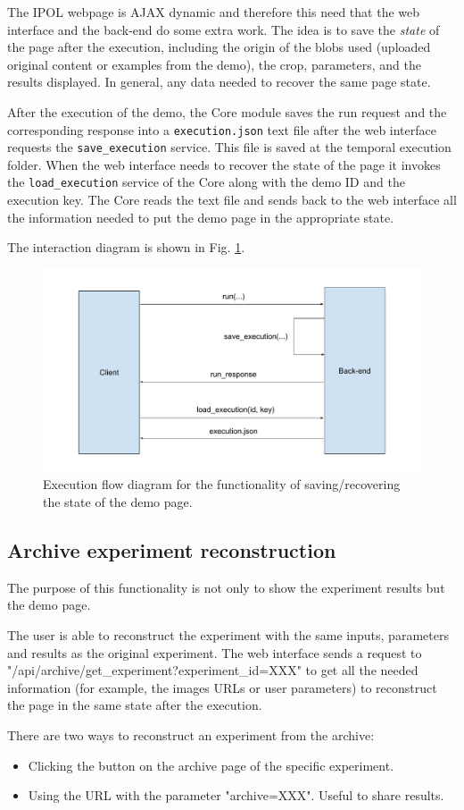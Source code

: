 The IPOL webpage is AJAX dynamic and therefore this need that the web interface and the back-end do some extra work. The idea is to save the \emph{state} of the page after the execution, including the origin of the blobs used (uploaded original content or examples from the demo), the crop, parameters, and the results displayed. In general, any data needed to recover the same page state.

After the execution of the demo, the Core module saves the run request and the corresponding response into a {\tt execution.json} text file after the web interface requests the {\tt save\_execution} service. This file is saved at the temporal execution folder.
%
When the web interface needs to recover the state of the page it invokes the {\tt load\_execution} service of the Core along with the demo ID and the execution key. The Core reads the text file and sends back to the web interface all the information needed to put the demo page in the appropriate state.

The interaction diagram is shown in Fig. \ref{fig:execution_flow}.

\begin{figure}[h]
	\centering
	\includegraphics[width=\textwidth]{images/execution_flow}
	\caption{Execution flow diagram for the functionality of saving/recovering the state of the demo page.} 
	\label{fig:execution_flow}
\end{figure}

\subsection{Archive experiment reconstruction}
The purpose of this functionality is not only to show the experiment results but the demo page.

The user is able to reconstruct the experiment with the same inputs, parameters and results as the original experiment. The web interface sends a request to "/api/archive/get\_experiment?experiment\_id=XXX" to get all the needed information (for example, the images URLs or user parameters) to reconstruct the page in the same state after the execution. 

\bigbreak

There are two ways to reconstruct an experiment from the archive:
\begin{itemize}
	\item Clicking the button on the archive page of the specific experiment.
	\item Using the URL with the parameter  "archive=XXX". Useful to share results.
\end{itemize}
